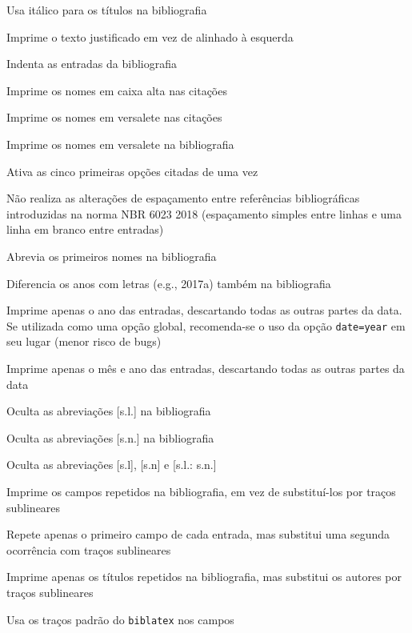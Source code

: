 \documentclass[a4paper]{article}
\begin{document}
\begin{description}[itemindent=-1em,leftmargin=3em]%
  \item [ittitles] Usa itálico para os títulos na bibliografia
  \item [justify] Imprime o texto justificado em vez de alinhado à esquerda
  \item [indent] Indenta as entradas da bibliografia
  \item [accite] Imprime os nomes em caixa alta nas citações
  \item [sccite] Imprime os nomes em versalete nas citações
  \item [scbib] Imprime os nomes em versalete na bibliografia
  \item [pretty] Ativa as cinco primeiras opções citadas de uma vez
  \item [oldspacing] Não realiza as alterações de espaçamento entre
    referências bibliográficas introduzidas na norma NBR 6023 2018
    (espaçamento simples entre linhas e uma linha em branco entre
    entradas)
  \item [giveninits] Abrevia os primeiros nomes na bibliografia
  \item [extrayear] Diferencia os anos com letras (e.g., 2017a)
    também na bibliografia
  \item [dateyear] Imprime apenas o ano das entradas, descartando todas as outras partes da data. Se utilizada como uma opção global, recomenda-se o uso da opção \texttt{date=year} em seu lugar (menor risco de bugs)
  \item [datemonth] Imprime apenas o mês e ano das entradas, descartando todas as outras partes da data
  \item [nosl] Oculta as abreviações [s.l.] na bibliografia
  \item [nosn] Oculta as abreviações [s.n.] na bibliografia
  \item [noslsn] Oculta as abreviações [s.l], [s.n] e [s.l.: s.n.]
  \item [repeatfields] Imprime os campos repetidos na bibliografia, em vez de
    subs\-ti\-tu\-í-los por traços sublineares
  \item [repeatfirstfields] Repete apenas o primeiro campo de cada entrada,
    mas substitui uma segunda ocorrência com traços sublineares
  \item [repeattitles] Imprime apenas os títulos repetidos na bibliografia,
    mas substitui os autores por traços sublineares
  \item [usedashes] Usa os traços padrão do \texttt{biblatex} nos campos

\end{description}
\end{document}
